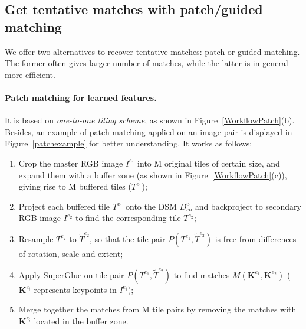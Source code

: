\subsection{Get tentative matches with patch/guided matching}\label{patch matching}
We offer two alternatives to recover tentative matches: patch or guided matching. %
The former often gives larger number of matches, while the latter is in general more efficient.
\paragraph{Patch matching for learned features.}
{{It} is based on \textit{one-to-one tiling scheme}}, as shown in Figure~\ref{WorkflowPatch}(b). Besides, an example of patch matching applied on an image pair is displayed in Figure~\ref{patchexample} for better understanding. It works as follows:
\begin{enumerate}
	\item Crop the master RGB image $I^{e_1}$ into M original tiles of certain size, and expand them with a buffer zone (as shown in Figure~\ref{WorkflowPatch}(c)), giving rise to M buffered tiles ($T^{e_1}$);
	\item Project each buffered tile $T^{e_1}$ onto the DSM $D_{co}^{e_1}$ and backproject to secondary RGB image $I^{e_2}$ to find the corresponding tile $T^{e_2}$;
	\item Resample $T^{e_2}$ to $\widetilde{T}^{e_2}$, so that the tile pair $P({T^{e_1},\widetilde{T}^{e_2}})$ is free from differences of rotation, scale and extent;
	\item Apply SuperGlue on tile pair $P({T^{e_1},\widetilde{T}^{e_2}})$ to find matches $M({\mathbf{K}^{e_1},\mathbf{K}^{e_2}})$ ($\mathbf{K}^{e_i}$ represents keypoints in $I^{e_i}$);
	\item Merge together the matches from M tile pairs by removing the matches with $\mathbf{K}^{e_i}$ located in the buffer zone.\\
\end{enumerate}

